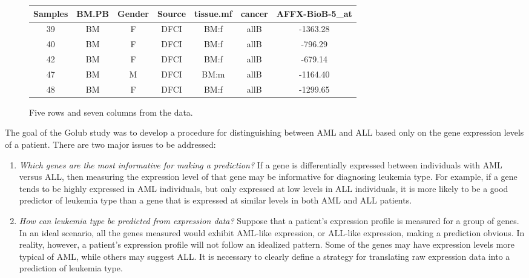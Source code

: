 \begin{figure}[h]
	\centering
	\begin{tabular}{ccccccc}
		\hline
		Samples & BM.PB & Gender & Source & tissue.mf & cancer & AFFX-BioB-5\_at \\ 
		\hline
		  39 & BM & F & DFCI & BM:f & allB & -1363.28 \\ 
		  40 & BM & F & DFCI & BM:f & allB & -796.29 \\ 
		  42 & BM & F & DFCI & BM:f & allB & -679.14 \\ 
		  47 & BM & M & DFCI & BM:m & allB & -1164.40 \\ 
		  48 & BM & F & DFCI & BM:f & allB & -1299.65 \\ 
		\hline
	\end{tabular}
	\caption{Five rows and seven columns from the  data.} 
	\label{sampleGolubData}
\end{figure}

The goal of the Golub study was to develop a procedure for distinguishing between AML and ALL based only on the gene expression levels of a patient. There are two major issues to be addressed:

\begin{enumerate}
	\item \textit{Which genes are the most informative for making a prediction?} If a gene is differentially expressed between individuals with AML versus ALL, then measuring the expression level of that gene may be informative for diagnosing leukemia type. For example, if a gene tends to be highly expressed in AML individuals, but only expressed at low levels in ALL individuals, it is more likely to be a good predictor of leukemia type than a gene that is expressed at similar levels in both AML and ALL patients.  
	
	\item \textit{How can leukemia type be predicted from expression data?} Suppose that a patient's expression profile is measured for a group of genes. In an ideal scenario, all the genes measured would exhibit AML-like expression, or ALL-like expression, making a prediction obvious. In reality, however, a patient's expression profile will not follow an idealized pattern. Some of the genes may have expression levels more typical of AML, while others may suggest ALL. It is necessary to clearly define a strategy for translating raw expression data into a prediction of leukemia type.
	
\end{enumerate}

